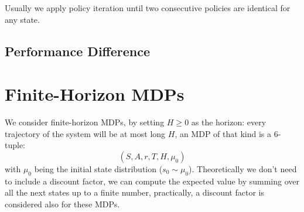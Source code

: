 \documentclass[10pt, a4paper]{report}
\begin{document}
\noindent Usually we apply policy iteration until two consecutive policies are identical for any state.
\subsection{Performance Difference}
\section{Finite-Horizon MDPs}
We consider finite-horizon MDPs, by setting $H\ge 0$ as the horizon: every trajectory of the system will be at most long $H$, an MDP of that kind is a 6-tuple:\begin{equation}
    (S,A,r,T,H,\mu_0)
\end{equation}
with $\mu_0$ being the initial state distribution ($s_0\sim \mu_0$). Theoretically we don't need to include a discount factor, we can compute the expected value by summing over all the next states up to a finite number, practically, a discount factor is considered also for these MDPs.
\end{document}

